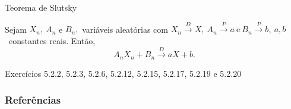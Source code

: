 \documentclass[12pt]{beamer}
\begin{document}
\begin{frame}{Teorema de Slutsky}
\begin{Teorema}
\justifying
Sejam $X_{n},~A_{n}$ e $B_{n},$ variáveis aleatórias com $X_{n} \overset{D}{\rightarrow} X,~A_{n} \overset{P}{\rightarrow} a~\text{e}~B_{n} \overset{P}{\rightarrow} b,~a,b$~constantes reais. Então, $$A_{n}X_{n}+B_{n} \overset{D}{\rightarrow} aX+b.$$
\end{Teorema}
\end{frame}

\begin{frame}{}
\begin{block}{\Home}
\justifying
Exercícios 5.2.2, 5.2.3, 5.2.6, 5.2.12, 5.2.15, 5.2.17, 5.2.19 e 5.2.20
\end{block}
\end{frame}

\begin{frame}[allowframebreaks]
\frametitle{\bf Referências}
\printbibliography
\end{frame}
\end{document}
